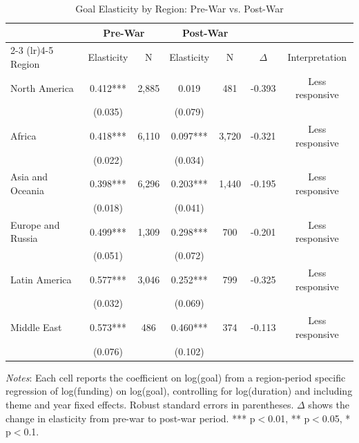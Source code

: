 \begin{table}[htbp]
\centering
\caption{Goal Elasticity by Region: Pre-War vs. Post-War}
\label{tab:regional_elasticity}
\begin{threeparttable}
\small
\begin{tabular}{lcccccc}
\toprule
& \multicolumn{2}{c}{Pre-War} & \multicolumn{2}{c}{Post-War} & & \\
\cmidrule(lr){2-3} \cmidrule(lr){4-5}
Region & Elasticity & N & Elasticity & N & $\Delta$ & Interpretation \\
\midrule
North America & 0.412*** & 2,885 & 0.019 & 481 & -0.393 & Less responsive \\
& (0.035) & & (0.079) & & & \\
Africa & 0.418*** & 6,110 & 0.097*** & 3,720 & -0.321 & Less responsive \\
& (0.022) & & (0.034) & & & \\
Asia and Oceania & 0.398*** & 6,296 & 0.203*** & 1,440 & -0.195 & Less responsive \\
& (0.018) & & (0.041) & & & \\
Europe and Russia & 0.499*** & 1,309 & 0.298*** & 700 & -0.201 & Less responsive \\
& (0.051) & & (0.072) & & & \\
Latin America & 0.577*** & 3,046 & 0.252*** & 799 & -0.325 & Less responsive \\
& (0.032) & & (0.069) & & & \\
Middle East & 0.573*** & 486 & 0.460*** & 374 & -0.113 & Less responsive \\
& (0.076) & & (0.102) & & & \\
\bottomrule
\end{tabular}
\begin{tablenotes}
\small
\item \textit{Notes}: Each cell reports the coefficient on log(goal) from a region-period specific regression of log(funding) on log(goal), controlling for log(duration) and including theme and year fixed effects. Robust standard errors in parentheses. $\Delta$ shows the change in elasticity from pre-war to post-war period. *** p$<$0.01, ** p$<$0.05, * p$<$0.1.
\end{tablenotes}
\end{threeparttable}
\end{table}

